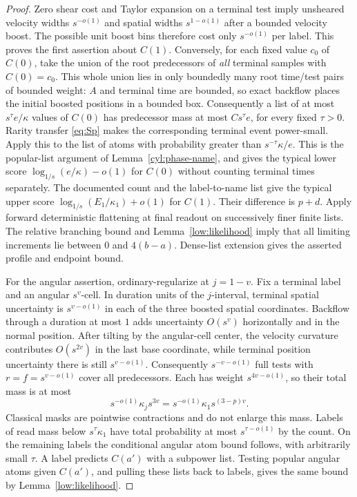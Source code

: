 \begin{proof}
Zero shear cost and Taylor expansion on a terminal test imply unsheared
velocity widths $s^{-o(1)}$ and spatial widths $s^{1-o(1)}$ after a
bounded velocity boost. The possible unit boost bins therefore cost only
$s^{-o(1)}$ per label. This proves the first assertion about $C(1)$.
Conversely, for each fixed value $c_0$ of $C(0)$, take the union of the
root predecessors of \emph{all} terminal samples with $C(0)=c_0$.
This whole union lies in only boundedly many root time/test pairs of
bounded weight: $A$ and terminal time are bounded, so exact backflow
places the initial boosted positions in a bounded box. Consequently a
list of at most $s^\tau e/\kappa$ values of $C(0)$ has predecessor mass
at most $Cs^\tau e$, for every fixed $\tau>0$. Rarity transfer
\eqref{eq:Sp} makes the corresponding terminal event power-small.
Apply this to the list of atoms with probability greater than
$s^{-\tau}\kappa/e$. This is the popular-list argument of
Lemma~\ref{cyl:phase-name}, and gives the typical lower score
$\log_{1/s}(e/\kappa)-o(1)$ for $C(0)$ without counting terminal times
separately. The documented count
and the label-to-name list give the typical upper score
$\log_{1/s}(E_1/\kappa_1)+o(1)$ for $C(1)$. Their difference is $p+d$.
Apply forward deterministic flattening at final readout on successively
finer finite lists. The relative branching bound and
Lemma~\ref{low:likelihood} imply that all limiting increments lie between
$0$ and $4(b-a)$. Dense-list extension gives the asserted profile and
endpoint bound.

For the angular assertion, ordinary-regularize at $j=1-v$. Fix a
terminal label and an angular $s^v$-cell. In duration units of the
$j$-interval, terminal spatial uncertainty is $s^{v-o(1)}$ in each of
the three boosted spatial coordinates. Backflow through a duration at
most $1$ adds uncertainty $O(s^v)$ horizontally and in the normal
position. After tilting by the angular-cell center, the velocity
curvature contributes $O(s^{2v})$ in the last base coordinate, while
terminal position uncertainty there is still $s^{v-o(1)}$.
Consequently $s^{-v-o(1)}$ full tests with $r=f=s^{v-o(1)}$ cover all
predecessors. Each has weight $s^{4v-o(1)}$, so their total mass is at
most
\[
 s^{-o(1)}\kappa_j s^{3v}
 =s^{-o(1)}\kappa_1s^{(3-p)v}.
\]
Classical masks are pointwise contractions and do not enlarge this
mass. Labels of read mass below $s^\tau\kappa_1$ have total probability
at most $s^{\tau-o(1)}$ by the count. On the remaining labels the
conditional angular atom bound follows, with arbitrarily small $\tau$.
A label predicts $C(a')$ with a subpower list. Testing popular angular
atoms given $C(a')$, and pulling these lists back to labels, gives the
same bound by Lemma~\ref{low:likelihood}.


\end{proof}
